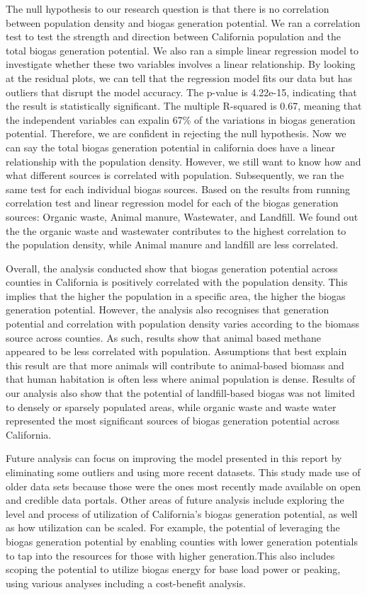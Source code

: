 \documentclass[
  12pt,
]{article}
\begin{document}
The null hypothesis to our research question is that there is no
correlation between population density and biogas generation potential.
We ran a correlation test to test the strength and direction between
California population and the total biogas generation potential. We also
ran a simple linear regression model to investigate whether these two
variables involves a linear relationship. By looking at the residual
plots, we can tell that the regression model fits our data but has
outliers that disrupt the model accuracy. The p-value is 4.22e-15,
indicating that the result is statistically significant. The multiple
R-squared is 0.67, meaning that the independent variables can expalin
67\% of the variations in biogas generation potential. Therefore, we are
confident in rejecting the null hypothesis. Now we can say the total
biogas generation potential in california does have a linear
relationship with the population density. However, we still want to know
how and what different sources is correlated with population.
Subsequently, we ran the same test for each individual biogas sources.
Based on the results from running correlation test and linear regression
model for each of the biogas generation sources: Organic waste, Animal
manure, Wastewater, and Landfill. We found out the the organic waste and
wastewater contributes to the highest correlation to the population
density, while Animal manure and landfill are less correlated.

Overall, the analysis conducted show that biogas generation potential
across counties in California is positively correlated with the
population density. This implies that the higher the population in a
specific area, the higher the biogas generation potential. However, the
analysis also recognises that generation potential and correlation with
population density varies according to the biomass source across
counties. As such, results show that animal based methane appeared to be
less correlated with population. Assumptions that best explain this
result are that more animals will contribute to animal-based biomass and
that human habitation is often less where animal population is dense.
Results of our analysis also show that the potential of landfill-based
biogas was not limited to densely or sparsely populated areas, while
organic waste and waste water represented the most significant sources
of biogas generation potential across California.

Future analysis can focus on improving the model presented in this
report by eliminating some outliers and using more recent datasets. This
study made use of older data sets because those were the ones most
recently made available on open and credible data portals. Other areas
of future analysis include exploring the level and process of
utilization of California's biogas generation potential, as well as how
utilization can be scaled. For example, the potential of leveraging the
biogas generation potential by enabling counties with lower generation
potentials to tap into the resources for those with higher
generation.This also includes scoping the potential to utilize biogas
energy for base load power or peaking, using various analyses including
a cost-benefit analysis.
\end{document}

